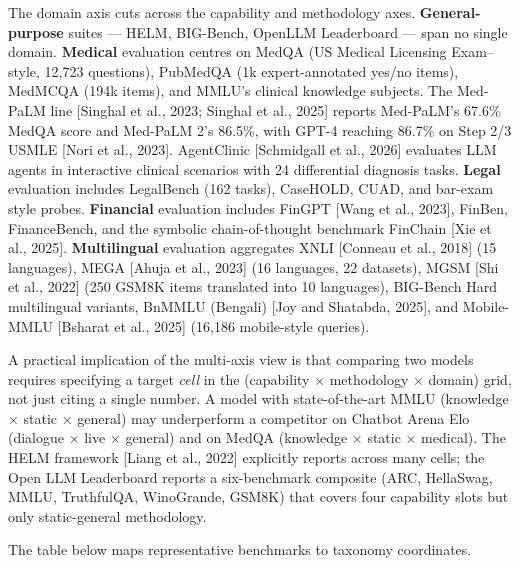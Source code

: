 The domain axis cuts across the capability and methodology axes. \textbf{General-purpose} suites --- HELM, BIG-Bench, OpenLLM Leaderboard --- span no single domain. \textbf{Medical} evaluation centres on MedQA (US Medical Licensing Exam--style, 12,723 questions), PubMedQA (1k expert-annotated yes/no items), MedMCQA (194k items), and MMLU's clinical knowledge subjects. The Med-PaLM line {[}Singhal et al., 2023; Singhal et al., 2025{]} reports Med-PaLM's 67.6\% MedQA score and Med-PaLM 2's 86.5\%, with GPT-4 reaching 86.7\% on Step 2/3 USMLE {[}Nori et al., 2023{]}. AgentClinic {[}Schmidgall et al., 2026{]} evaluates LLM agents in interactive clinical scenarios with 24 differential diagnosis tasks. \textbf{Legal} evaluation includes LegalBench (162 tasks), CaseHOLD, CUAD, and bar-exam style probes. \textbf{Financial} evaluation includes FinGPT {[}Wang et al., 2023{]}, FinBen, FinanceBench, and the symbolic chain-of-thought benchmark FinChain {[}Xie et al., 2025{]}. \textbf{Multilingual} evaluation aggregates XNLI {[}Conneau et al., 2018{]} (15 languages), MEGA {[}Ahuja et al., 2023{]} (16 languages, 22 datasets), MGSM {[}Shi et al., 2022{]} (250 GSM8K items translated into 10 languages), BIG-Bench Hard multilingual variants, BnMMLU (Bengali) {[}Joy and Shatabda, 2025{]}, and Mobile-MMLU {[}Bsharat et al., 2025{]} (16,186 mobile-style queries).

A practical implication of the multi-axis view is that comparing two models requires specifying a target \emph{cell} in the (capability × methodology × domain) grid, not just citing a single number. A model with state-of-the-art MMLU (knowledge × static × general) may underperform a competitor on Chatbot Arena Elo (dialogue × live × general) and on MedQA (knowledge × static × medical). The HELM framework {[}Liang et al., 2022{]} explicitly reports across many cells; the Open LLM Leaderboard reports a six-benchmark composite (ARC, HellaSwag, MMLU, TruthfulQA, WinoGrande, GSM8K) that covers four capability slots but only static-general methodology.

The table below maps representative benchmarks to taxonomy coordinates.

